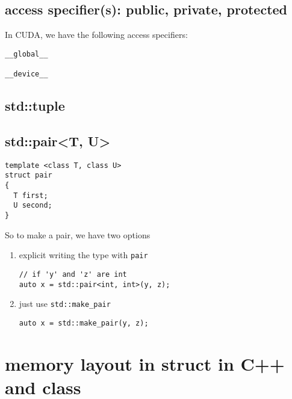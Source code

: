 \subsection{access specifier(s): public, private, protected}
\label{sec:access-specifier}

\begin{mdframed}

In CUDA, we have the following access specifiers:
\begin{verbatim}
__global__ 

__device__
\end{verbatim}
\end{mdframed}

\subsection{std::tuple}
\label{sec:tuple}

\subsection{std::pair<T, U>}
\label{sec:pair}
\label{sec:std::pair}

\begin{verbatim}
template <class T, class U>
struct pair
{
  T first;
  U second;
}
\end{verbatim}

So to make a pair, we have two options
\begin{enumerate}
  \item explicit writing the type with \verb!pair!
  
\begin{verbatim}
// if 'y' and 'z' are int
auto x = std::pair<int, int>(y, z);
\end{verbatim}
  
  \item just use \verb!std::make_pair!
  
\begin{verbatim}
auto x = std::make_pair(y, z);
\end{verbatim}
\end{enumerate}


\section{memory layout in struct in C++ and class }
\label{sec:memory-layout-data-members-in-struct-C++}
\label{sec:memory-layout-data-members-in-class-C++}

